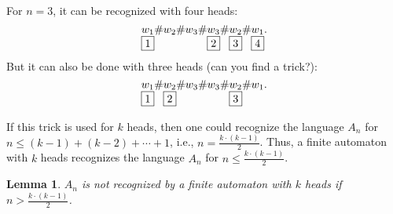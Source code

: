 \documentclass[12pt,sans]{article}
\theoremstyle{definition}
\theoremstyle{plain}
\newtheorem{lemma}{Lemma}[section]
\theoremstyle{remark}
\begin{document}
For $n = 3$, it can be recognized with four heads:
\[
\underset{\fbox{1}}{w_1}\#w_2\#w_3\#\underset{\fbox{2}}{w_3}\#\underset{\fbox{3}}{w_2}\#\underset{\fbox{4}}{w_1}.
\]
But it can also be done with three heads (can you find a trick?):
\[
\underset{\fbox{1}}{w_1}\#\underset{\fbox{2}}{w_2}\#w_3\#w_3\#\underset{\fbox{3}}{w_2}\#w_1.
\]

If this trick is used for $k$ heads, then one could recognize the language $A_n$ for $n \le (k-1) + (k-2) + \dotsb + 1$, i.e., $n = \frac{k \cdot (k-1)}{2}$. Thus, a finite automaton with $k$ heads recognizes the language $A_n$ for $n \le \frac{k \cdot (k-1)}{2}$.

\begin{lemma}
    $A_n$ is not recognized by a finite automaton with $k$ heads if $n > \frac{k \cdot (k-1)}{2}$.
\end{lemma}
\end{document}
